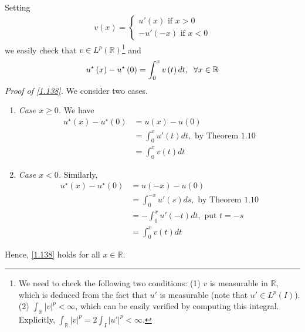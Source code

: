 \documentclass[a4paper,oneside]{book}
\numberwithin{equation}{chapter}
\begin{document}
Setting
\begin{align}
v\left( x \right) = \left\{ {\begin{array}{*{20}{c}}
{u'\left( x \right)\mbox{ if } x > 0}\\
{ - u'\left( { - x} \right)\mbox{ if } x < 0}
\end{array}} \right.
\end{align}
we easily check that $v\in L^p\left(\mathbb{R}\right)$\footnote{We need to check the following two conditions: (1) $v$ is measurable in $\mathbb{R}$, which is deduced from the fact that $u'$ is measurable (note that $u'\in L^p\left(I\right)$). (2) $\int_{\mathbb{R}} {{{\left| v \right|}^p}}  < \infty $, which can be easily verified by computing this integral. Explicitly, $\int_{\mathbb{R}} {{{\left| v \right|}^p}}  = 2\int_I {{{\left| {u'} \right|}^p}}  < \infty $.} and
\begin{align}
\label{1.138}
u^{\star}\left( x \right) - u^{\star} \left( 0 \right) = \int_0^x {v\left( t \right)dt} ,\hspace{0.2cm}\forall x \in \mathbb{R}
\end{align}
\textit{Proof of \eqref{1.138}.} We consider two cases.
\begin{enumerate}
\item \textit{Case $x\ge 0$.} We have
\begin{align}
u^{\star}\left( x \right) - u^{\star}\left( 0 \right) &= u\left( x \right) - u\left( 0 \right)\\
&= \int_0^x {u'\left( t \right)dt} ,\mbox{ by Theorem 1.10}\\
 &= \int_0^x {v\left( t \right)dt} 
\end{align}
\item \textit{Case $x<0$.} Similarly,
\begin{align}
u^{\star}\left( x \right) - u^{\star}\left( 0 \right) &= u\left( { - x} \right) - u\left( 0 \right)\\
 &= \int_0^{ - x} {u'\left( s \right)ds} ,\mbox{ by Theorem 1.10}\\
 &=  - \int_0^x {u'\left( { - t} \right)dt} ,\mbox{ put } t =  - s\\
 &= \int_0^x {v\left( t \right)dt} 
\end{align}
\end{enumerate}
Hence, \eqref{1.138} holds for all $x\in \mathbb{R}$. 
\end{document}
